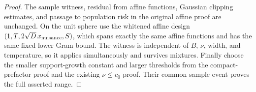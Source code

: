 \begin{proof}
The sample witness, residual from affine functions, Gaussian clipping estimates, and passage to population risk in the original affine proof are unchanged. On the unit sphere use the whitened affine design $(1,T,2\sqrt D\,x_{\rm nuisance},S)$, which spans exactly the same affine functions and has the same fixed lower Gram bound. The witness is independent of $B$, $\nu$, width, and temperature, so it applies simultaneously and survives mixtures. Finally choose the smaller support-growth constant and larger thresholds from the compact-prefactor proof and the existing $\nu\le c_0$ proof. Their common sample event proves the full asserted range.
\end{proof}
